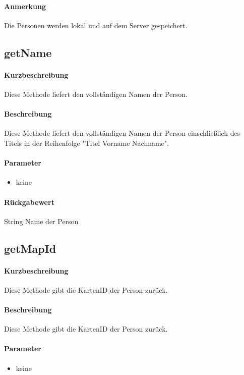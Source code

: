 \paragraph*{Anmerkung}
Die Personen werden lokal und auf dem Server gespeichert.

\subsection{getName}%
\paragraph*{Kurzbeschreibung}
Diese Methode liefert den vollständigen Namen der Person.
\paragraph*{Beschreibung}
Diese Methode liefert den vollständigen Namen der Person einschließlich des Titels in der Reihenfolge "Titel Vorname Nachname".
\paragraph*{Parameter}
\begin{itemize}
    \item keine
\end{itemize}
\paragraph*{Rückgabewert}
String Name der Person

\subsection{getMapId}
\paragraph*{Kurzbeschreibung}
Diese Methode gibt die KartenID der Person zurück.
\paragraph*{Beschreibung}
Diese Methode gibt die KartenID der Person zurück.
\paragraph*{Parameter}
\begin{itemize}
    \item keine
\end{itemize}
